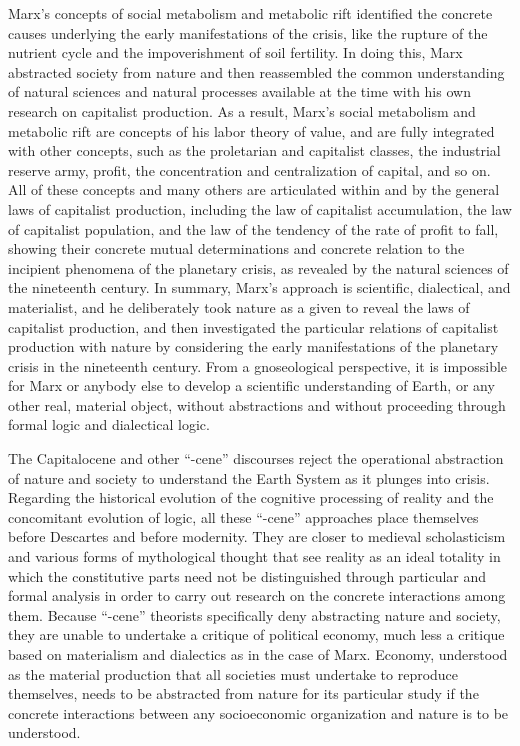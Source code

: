 \documentclass[
]{book}
\begin{document}
Marx's concepts of social metabolism and metabolic rift identified the concrete causes underlying the early manifestations of the crisis, like the rupture of the nutrient cycle and the impoverishment of soil fertility. In doing this, Marx abstracted society from nature and then reassembled the common understanding of natural sciences and natural processes available at the time with his own research on capitalist production. As a result, Marx's social metabolism and metabolic rift are concepts of his labor theory of value, and are fully integrated with other concepts, such as the proletarian and capitalist classes, the industrial reserve army, profit, the concentration and centralization of capital, and so on. All of these concepts and many others are articulated within and by the general laws of capitalist production, including the law of capitalist accumulation, the law of capitalist population, and the law of the tendency of the rate of profit to fall, showing their concrete mutual determinations and concrete relation to the incipient phenomena of the planetary crisis, as revealed by the natural sciences of the nineteenth century. In summary, Marx's approach is scientific, dialectical, and materialist, and he deliberately took nature as a given to reveal the laws of capitalist production, and then investigated the particular relations of capitalist production with nature by considering the early manifestations of the planetary crisis in the nineteenth century. From a gnoseological perspective, it is impossible for Marx or anybody else to develop a scientific understanding of Earth, or any other real, material object, without abstractions and without proceeding through formal logic and dialectical logic.

The Capitalocene and other ``-cene'' discourses reject the operational abstraction of nature and society to understand the Earth System as it plunges into crisis. Regarding the historical evolution of the cognitive processing of reality and the concomitant evolution of logic, all these ``-cene'' approaches place themselves before Descartes and before modernity. They are closer to medieval scholasticism and various forms of mythological thought that see reality as an ideal totality in which the constitutive parts need not be distinguished through particular and formal analysis in order to carry out research on the concrete interactions among them. Because ``-cene'' theorists specifically deny abstracting nature and society, they are unable to undertake a critique of political economy, much less a critique based on materialism and dialectics as in the case of Marx. Economy, understood as the material production that all societies must undertake to reproduce themselves, needs to be abstracted from nature for its particular study if the concrete interactions between any socioeconomic organization and nature is to be understood.
\end{document}

